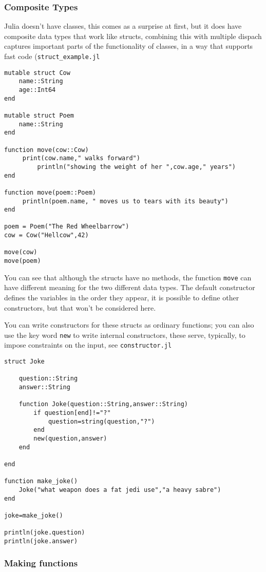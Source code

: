 \documentclass[12pt]{article}
\begin{document}
\subsubsection*{Composite Types}
Julia doesn't have classes, this comes as a surprise at first, but it
does have composite data types that work like structs, combining this
with multiple dispach captures important parts of the functionality of
classes, in a way that supports fast code (\texttt{struct\_example.jl}
\begin{lstlisting}[numbers=right]
mutable struct Cow
	name::String
	age::Int64
end

mutable struct Poem
	name::String
end	

function move(cow::Cow)
	 print(cow.name," walks forward") 
         println("showing the weight of her ",cow.age," years")
end

function move(poem::Poem)
	 println(poem.name, " moves us to tears with its beauty")
end

poem = Poem("The Red Wheelbarrow")
cow = Cow("Hellcow",42)

move(cow)
move(poem)
\end{lstlisting}
You can see that although the structs have no methods, the function
\texttt{move} can have different meaning for the two different data
types. The default constructor defines the variables in the order they
appear, it is possible to define other constructors, but that won't be
considered here.

You can write constructors for these structs as ordinary functions; you can also use the key word \texttt{new} to write internal constructors, these serve, typically, to impose constraints on the input, see \texttt{constructor.jl}
\begin{lstlisting}[numbers=right]
struct Joke

    question::String
    answer::String

    function Joke(question::String,answer::String)
        if question[end]!="?"
            question=string(question,"?")
        end
        new(question,answer)
    end

end

function make_joke()
    Joke("what weapon does a fat jedi use","a heavy sabre")
end

joke=make_joke()

println(joke.question)
println(joke.answer)
\end{lstlisting}

\subsubsection*{Making functions}
\end{document}
